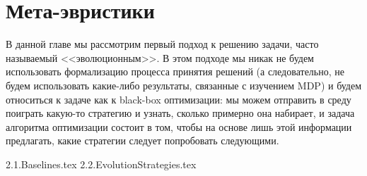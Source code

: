 \chapter{Мета-эвристики}\label{metaheuristicchapter}

В данной главе мы рассмотрим первый подход к решению задачи, часто называемый <<эволюционным>>. В этом подходе мы никак не будем использовать формализацию процесса принятия решений (а следовательно, не будем использовать какие-либо результаты, связанные с изучением MDP) и будем относиться к задаче как к black-box оптимизации: мы можем отправить в среду поиграть какую-то стратегию и узнать, сколько примерно она набирает, и задача алгоритма оптимизации состоит в том, чтобы на основе лишь этой информации предлагать, какие стратегии следует попробовать следующими. 

{2.1.Baselines.tex}
{2.2.EvolutionStrategies.tex}
